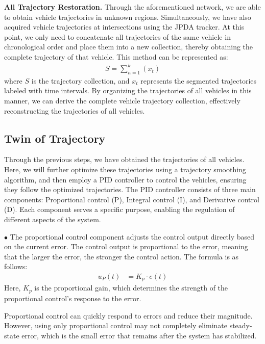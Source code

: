 \textbf{All Trajectory Restoration.}
Through the aforementioned network, we are able to obtain vehicle trajectories in unknown regions. 
Simultaneously, we have also acquired vehicle trajectories at intersections using the JPDA tracker. 
At this point, we only need to concatenate all trajectories of the same vehicle in chronological order and place them into a new collection, thereby obtaining the complete trajectory of that vehicle. 
This method can be represented as: 
\begin{align}
	S = \sum_{n = 1}^{k} \left ( x_{t}  \right ) 
\end{align}
where $S$ is the trajectory collection, and $x_{t}$ represents the segmented trajectories labeled with time intervals. 
By organizing the trajectories of all vehicles in this manner, we can derive the complete vehicle trajectory collection, effectively reconstructing the trajectories of all vehicles.

\subsection{Twin of Trajectory}

Through the previous steps, we have obtained the trajectories of all vehicles. 
Here, we will further optimize these trajectories using a trajectory smoothing algorithm, and then employ a PID controller to control the vehicles, ensuring they follow the optimized trajectories\cite{Alpher22d}. 
The PID controller consists of three main components: Proportional control (P), Integral control (I), and Derivative control (D). Each component serves a specific purpose, enabling the regulation of different aspects of the system.

$\bullet$ The proportional control component adjusts the control output directly based on the current error. 
The control output is proportional to the error, meaning that the larger the error, the stronger the control action. 
The formula is as follows:
\begin{align}
	u_{P}(t) & = K_{p} \cdot e(t)
\end{align}
Here, $K_{p}$ is the proportional gain, which determines the strength of the proportional control's response to the error.

Proportional control can quickly respond to errors and reduce their magnitude.
However, using only proportional control may not completely eliminate steady-state error, which is the small error that remains after the system has stabilized.

